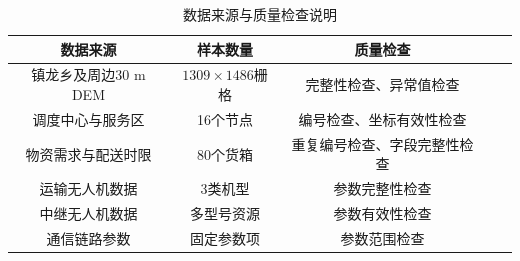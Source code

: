 \begin{table}[htbp]
	\centering
	\caption{数据来源与质量检查说明}
	\label{tab:data_quality}
	\begin{tabularx}{0.98\textwidth}{ccccc}
		\toprule
		数据来源 &  样本数量 & 质量检查 \\
		\midrule
		镇龙乡及周边30 m DEM 
		& $1309\times1486$栅格 
		& 完整性检查、异常值检查 \\
		
		调度中心与服务区
		& 16个节点 
		& 编号检查、坐标有效性检查 \\
		
		物资需求与配送时限
		& 80个货箱 
		& 重复编号检查、字段完整性检查 \\
		
		运输无人机数据
		& 3类机型 
		& 参数完整性检查 \\
		
		中继无人机数据
		& 多型号资源 
		& 参数有效性检查 \\
		
		通信链路参数
		& 固定参数项 
		& 参数范围检查 \\
		\bottomrule
	\end{tabularx}
\end{table}
\\
